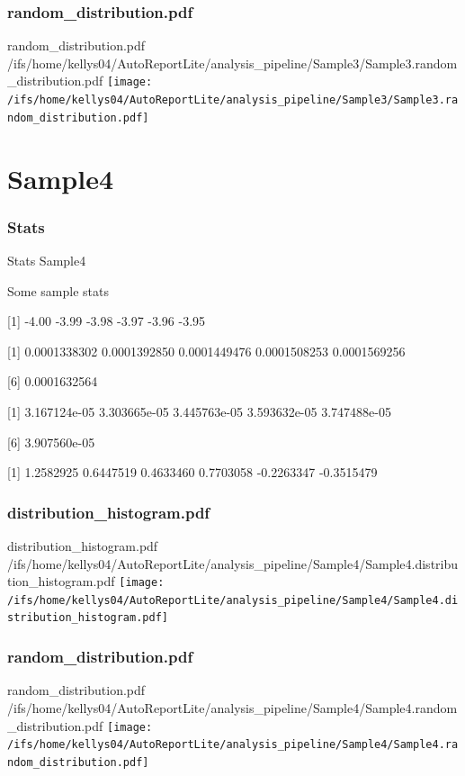 \documentclass[8pt]{beamer}\usepackage[]{graphicx}\usepackage[]{color}
\begin{document}
\subsubsection{random\_distribution.pdf}
\begin{frame}{random\_distribution.pdf }
\scriptsize{/ifs/home/kellys04/AutoReportLite/analysis\_pipeline/Sample3/Sample3.random\_distribution.pdf}
\texttt{[image: /ifs/home/kellys04/AutoReportLite/analysis\_pipeline/Sample3/Sample3.random\_distribution.pdf]}
\end{frame}

\section{Sample4}
\subsubsection{Stats}
\begin{frame}{Stats }
Sample4 

Some sample stats

[1] -4.00 -3.99 -3.98 -3.97 -3.96 -3.95

[1] 0.0001338302 0.0001392850 0.0001449476 0.0001508253 0.0001569256

[6] 0.0001632564

[1] 3.167124e-05 3.303665e-05 3.445763e-05 3.593632e-05 3.747488e-05

[6] 3.907560e-05

[1]  1.2582925  0.6447519  0.4633460  0.7703058 -0.2263347 -0.3515479
\scriptsize{}
\end{frame}

\subsubsection{distribution\_histogram.pdf}
\begin{frame}{distribution\_histogram.pdf }
\scriptsize{/ifs/home/kellys04/AutoReportLite/analysis\_pipeline/Sample4/Sample4.distribution\_histogram.pdf}
\texttt{[image: /ifs/home/kellys04/AutoReportLite/analysis\_pipeline/Sample4/Sample4.distribution\_histogram.pdf]}
\end{frame}

\subsubsection{random\_distribution.pdf}
\begin{frame}{random\_distribution.pdf }
\scriptsize{/ifs/home/kellys04/AutoReportLite/analysis\_pipeline/Sample4/Sample4.random\_distribution.pdf}
\texttt{[image: /ifs/home/kellys04/AutoReportLite/analysis\_pipeline/Sample4/Sample4.random\_distribution.pdf]}
\end{frame}
\end{document}
